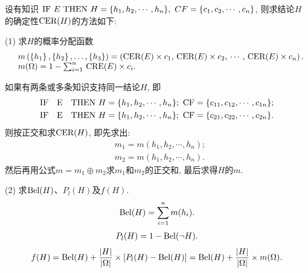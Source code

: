 设有知识 $\textup{IF}\,\, E \,\, \textup{THEN} \,\, H=\{h_1, h_2, \cdots , h_n\}, \,\, CF=\{c_1, c_2, \cdots, c_n\}$, 则求结论$H$的确定性$\textup{CER}(H)$的方法如下:

(1) 求$H$的概率分配函数
\begin{align}
    \begin{array}{ll}
        &m\left(\left\{h_{1}\right\},\left\{h_{2}\right\}, \ldots,\left\{h_{3}\right\} \right)
           =\left( \textup{CER}(E) \times c_{1},\, \textup{CER}(E) \times c_{2},\, \cdots,\, \textup{CER}(E) \times c_{n}\right).\\
        &m(\Omega)=1-\sum_{i=1}^{n} \,\textup{CRE}(E) \times c_{i}.
    \end{array}
\end{align}

\begin{example}
 如果有两条或多条知识支持同一结论$H$, 即
 \begin{align}
    &\textup{IF \,\,  E \,\,  THEN}   \,\, H=\{h_1, h_2, \cdots , h_n\};\,\,  \textup{CF}=\{c_{11}, c_{12}, \cdots , c_{1n}\};\\
    &\textup{IF \,\,  E \,\,  THEN}  \,\,  H=\{h_1, h_2, \cdots , h_n\};\,\,  \textup{CF}=\{c_{21}, c_{22}, \cdots , c_{2n}\}.
\end{align}
则按正交和求$\textup{CER}(H)$, 即先求出:
\begin{align*}
    &m_1=m({h_1},{h_2},\cdots,{h_n});\\
    &m_2=m({h_1},{h_2},\cdots,{h_n}).
\end{align*}
然后再用公式$m=m_{1} \oplus m_{2}$求$m_1$和$m_2$的正交和, 最后求得$H$的$m$.
\end{example}

(2) 求$\textup{Bel}(H)$、$P_l(H)$及$f(H)$.
\begin{align*}
    \textup{Bel}(H)=\sum_{i=1}^{n} m(h_i).
\end{align*}
\begin{align*}
    P_l(H)=1-\textup{Bel}(\neg H).
\end{align*}
\begin{align*}
    f(H)=\textup{Bel}(H)+\frac{|H|}{|\Omega|} \times [P_l(H)-\textup{Bel}(H)] = \textup{Bel}(H)+\frac{|H|}{|\Omega|} \times m(\Omega).
\end{align*}

